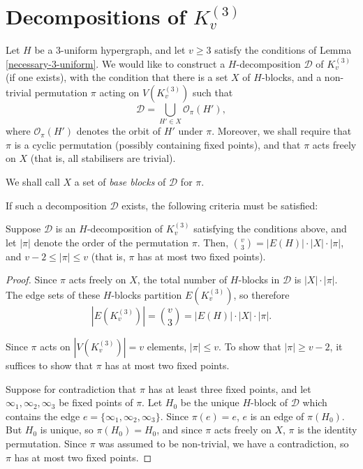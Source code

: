 \section{Decompositions of $K_{v}^{(3)}$}

Let $H$ be a $3$-uniform hypergraph, and let $v \geq 3$ satisfy the conditions of Lemma \ref{necessary-3-uniform}. We would like to construct a $H$-decomposition $\mathcal{D}$ of $K_{v}^{(3)}$ (if one exists), with the condition that there is a set $X$ of $H$-blocks, and a non-trivial permutation $\pi$ acting on $V(K_{v}^{(3)})$ such that
\begin{equation} \label{eq:complete-decomposition-orbit}
    \mathcal{D} = \bigcup_{H' \in X} \mathcal{O}_\pi(H'),
\end{equation}
where $\mathcal{O}_{\pi}(H')$ denotes the orbit of $H'$ under $\pi$.
Moreover, we shall require that $\pi$ is a cyclic permutation (possibly containing fixed points), and that $\pi$ acts freely on $X$ (that is, all stabilisers are trivial).

We shall call $X$ a set of {\em base blocks} of $\mathcal{D}$ for $\mathcal{\pi}$.

If such a decomposition $\mathcal{D}$ exists, the following criteria must be satisfied:

\begin{lemma}
Suppose $\mathcal{D}$ is an $H$-decomposition of $K_{v}^{(3)}$ satisfying the conditions above, and let $|\pi|$ denote the order of the permutation $\pi$.
Then, ${v \choose 3} = |E(H)| \cdot |X| \cdot |\pi|$, and $v-2 \leq |\pi| \leq v$ (that is, $\pi$ has at most two fixed points).
\end{lemma}

\begin{proof} %
Since $\pi$ acts freely on $X$, the total number of $H$-blocks in $\mathcal{D}$ is $|X| \cdot |\pi|$. The edge sets of these $H$-blocks partition $E(K_{v}^{(3)})$, so therefore
\[
    |E(K_{v}^{(3)})| = {v \choose 3} = |E(H)| \cdot |X| \cdot |\pi|.
\]

Since $\pi$ acts on $|V(K_{v}^{(3)})| = v$ elements, $|\pi| \leq v$.
To show that $|\pi| \geq v-2$, it suffices to show that $\pi$ has at most two fixed points.

Suppose for contradiction that $\pi$ has at least three fixed points, and let $\infty_1, \infty_2, \infty_3$ be fixed points of $\pi$. Let $H_0$ be the unique $H$-block of $\mathcal{D}$ which contains the edge $e = \{\infty_1, \infty_2, \infty_3\}$.
Since $\pi(e) = e$, $e$ is an edge of $\pi(H_0)$. But $H_0$ is unique, so $\pi(H_0) = H_0$, and since $\pi$ acts freely on $X$, $\pi$ is the identity permutation.
Since $\pi$ was assumed to be non-trivial, we have a contradiction, so $\pi$ has at most two fixed points.
\end{proof}

